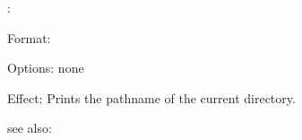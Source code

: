 \colab{} \pwd:

Format: 

Options: none

Effect:  Prints the pathname of the current directory.
         
see also: \cd
